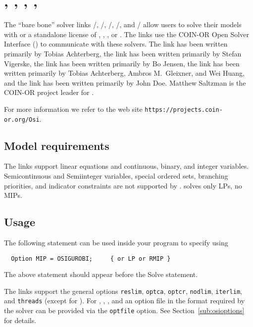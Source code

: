 

\section{\OSICPLEX, \OSIGUROBI, \OSIMOSEK, \OSISOPLEX, \OSIXPRESS}

The ``bare bone'' solver links \GAMS/\OSICPLEX, \GAMS/\OSIGUROBI, \GAMS/\OSIMOSEK, \GAMS/\OSISOPLEX, and \GAMS/\OSIXPRESS
allow users to solve their \GAMS models with \SOPLEX or a standalone license of \CPLEX, \GUROBI, \MOSEK, or \XPRESS.
The links use the COIN-OR Open Solver Interface (\OSI) to communicate with these solvers.
The \OSICPLEX link has been written primarily by Tobias Achterberg,
the \OSIGUROBI link has been written primarily by Stefan Vigerske,
the \OSIMOSEK link has been written primarily by Bo Jensen,
the \OSISOPLEX link has been written primarily by Tobias Achterberg, Ambros M.\ Gleixner, and Wei Huang, and
the \OSIXPRESS link has been written primarily by John Doe.
Matthew Saltzman is the COIN-OR project leader for \OSI.

For more information we refer to the \OSI web site \texttt{https://projects.coin-or.org/Osi}.

\subsection{Model requirements}

The \OSI links support linear equations and continuous, binary, and integer variables.
Semicontinuous and Semiinteger variables, special ordered sets, branching priorities, and indicator constraints are not supported by \OSI.
\OSISOPLEX solves only LPs, no MIPs.

\subsection{Usage}

The following statement can be used inside your \GAMS program to specify using \OSIGUROBI
\begin{verbatim}
  Option MIP = OSIGUROBI;     { or LP or RMIP }
\end{verbatim}

The above statement should appear before the Solve statement.

The links support the general \GAMS options \texttt{reslim}, \texttt{optca}, \texttt{optcr}, \texttt{nodlim}, \texttt{iterlim}, and \texttt{threads} (except for \OSISOPLEX).
For \OSICPLEX, \OSIGUROBI, \OSIMOSEK, and \OSIXPRESS an option file in the format required by the solver can be provided via the \GAMS \texttt{optfile} option.
See Section~\ref{sub:osioptions} for details.

